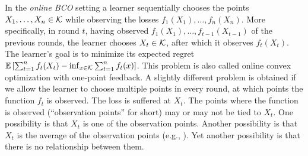 In the \emph{online BCO} setting a learner sequentially chooses the points $X_1,\dots,X_n\in \mathcal{K}$ while observing the losses $f_1(X_1),\dots,f_n(X_n)$. More specifically, in round $t$, having observed $f_1(X_1),\dots,f_{t-1}(X_{t-1})$ of the previous rounds, the learner chooses $X_t\in \mathcal{K}$, after which it observes $f_t(X_t)$. The learner's goal is to minimize its expected regret $\mathbb{E}\left[ \sum_{t=1}^n f_t(X_t) - \inf_{x\in \mathcal{K}} \sum_{t=1}^n f_t(x) \right]$. 
This problem is also called online convex optimization with one-point feedback.
A slightly different problem is obtained if we allow the learner to choose multiple points in every round, at which points the function $f_t$ is observed. The loss is suffered at $X_t$. The points where the function is observed (``observation points'' for short) may or may not be tied to $X_t$. One possibility is that $X_t$ is one of the observation points.  
Another possibility is that $X_t$ is the average of the observation points (e.g., \citet{AgDeXi10}). Yet another possibility is that there is no relationship between them. 

